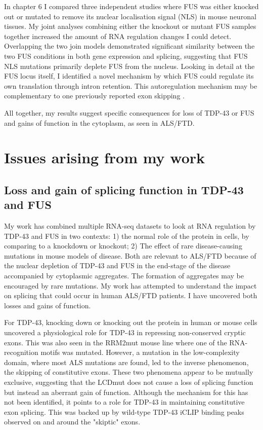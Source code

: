 In chapter 6 I compared three independent studies where FUS was either knocked out or mutated to remove its nuclear localisation signal (NLS) in mouse neuronal tissues.
My joint analyses combining either the knockout or mutant FUS samples together increased the amount of RNA regulation changes I could detect.
Overlapping the two join models demonstrated significant similarity between the two FUS conditions in both gene expression and splicing, suggesting that FUS NLS mutations primarily deplete FUS from the nucleus.
Looking in detail at the FUS locus itself, I identified a novel mechanism by which FUS could regulate its own translation through intron retention. 
This autoregulation mechanism may be complementary to one previously reported exon skipping \citep{Zhou2013}.

All together, my results suggest specific consequences for loss of TDP-43 or FUS and gains of function in the cytoplasm, as seen in ALS/FTD.

\section{Issues arising from my work}

\subsection{Loss and gain of splicing function in TDP-43 and FUS}

My work has combined multiple RNA-seq datasets to look at RNA regulation by TDP-43 and FUS in two contexts: 
1) the normal role of the protein in cells, by comparing to a knockdown or knockout; 
2) The effect of rare disease-causing mutations in mouse models of disease.
Both are relevant to ALS/FTD because of the nuclear depletion of TDP-43 and FUS in the end-stage of the disease accompanied by cytoplasmic aggregates.
The formation of aggregates may be encouraged by rare mutations.
My work has attempted to understand the impact on splicing that could occur in human ALS/FTD patients.
I have uncovered both losses and gains of function. 

For TDP-43, knocking down or knocking out the protein in human or mouse cells uncovered a physiological role for TDP-43 in repressing non-conserved cryptic exons. 
This was also seen in the RRM2mut mouse line where one of the RNA-recognition motifs was mutated.
However, a mutation in the low-complexity domain, where most ALS mutations are found, led to the inverse phenomenon, the skipping of constitutive exons.
These two phenomena appear to be mutually exclusive, suggesting that the LCDmut does not cause a loss of splicing function but instead an aberrant gain of function.
Although the mechanism for this has not been identified, it points to a role for TDP-43 in maintaining constitutive exon splicing.
This was backed up by wild-type TDP-43 iCLIP binding peaks observed on and around the "skiptic" exons.

